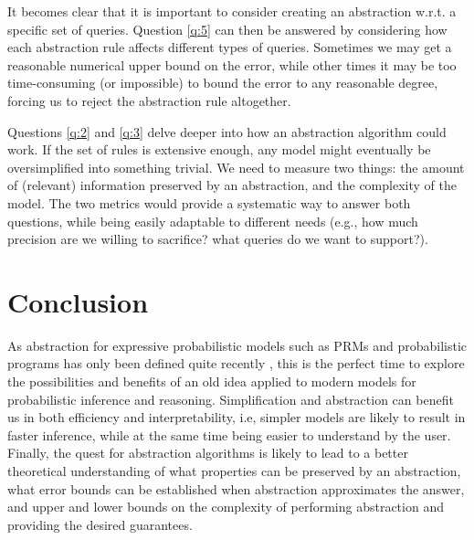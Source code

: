 \documentclass{article}
\begin{document}
It becomes clear that it is important to consider creating an abstraction w.r.t.
a specific set of queries. Question \ref{q:5} can then be answered by
considering how each abstraction rule affects different types of queries.
Sometimes we may get a reasonable numerical upper bound on the error, while
other times it may be too time-consuming (or impossible) to bound the error to
any reasonable degree, forcing us to reject the abstraction rule altogether.

Questions \ref{q:2} and \ref{q:3} delve deeper into how an abstraction algorithm
could work. If the set of rules is extensive enough, any model might
eventually be oversimplified into something trivial. We need to measure two
things: the amount of (relevant) information preserved by an abstraction, and
the complexity of the model. The two metrics would provide a systematic way to
answer both questions, while being easily adaptable to different needs (e.g.,
how much precision are we willing to sacrifice? what queries do we want to
support?).

\section{Conclusion}

As abstraction for expressive probabilistic models such as PRMs and
probabilistic programs has only been defined quite recently
\cite{belle2018abstracting,DBLP:conf/uai/HoltzenMB17}, this is the perfect time
to explore the possibilities and benefits of an old idea applied to modern
models for probabilistic inference and reasoning. Simplification and abstraction
can benefit us in both efficiency and interpretability, i.e, simpler models are
likely to result in faster inference, while at the same time being easier to
understand by the user. Finally, the quest for abstraction algorithms is likely
to lead to a better theoretical understanding of what properties can be
preserved by an abstraction, what error bounds can be established when
abstraction approximates the answer, and upper and lower bounds on the
complexity of performing abstraction and providing the desired guarantees.



\end{document}
